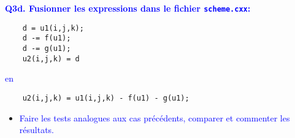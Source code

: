 \documentclass{beamer}
\begin{document}
\begin{frame}[fragile]
	\textcolor{blue}{\bf Q3d. Fusionner les expressions dans le fichier {\tt scheme.cxx}:}
	\begin{lstlisting}
	d = u1(i,j,k);
	d -= f(u1);
	d -= g(u1);
	u2(i,j,k) = d
	\end{lstlisting}
	
	\textcolor{blue}{en} 
	\begin{lstlisting}
	u2(i,j,k) = u1(i,j,k) - f(u1) - g(u1);
	\end{lstlisting}
	
	\begin{itemize}
		\item \textcolor{blue}{Faire les tests analogues aux cas pr\'ec\'edents, comparer et commenter les r\'esultats.}
	\end{itemize}
\end{frame}
\end{document}
